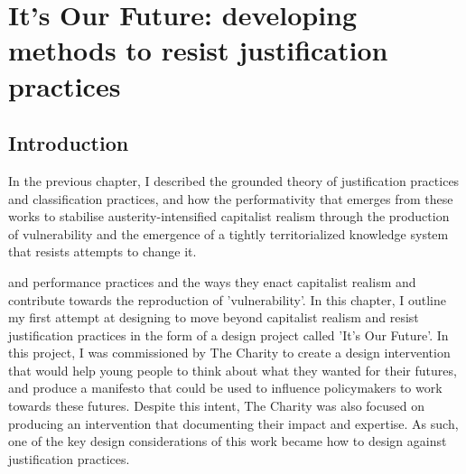 \chapter{It's Our Future: developing methods to resist justification practices}
\label{ch:7}

\section{Introduction}
\label{sec: 7-intro}

In the previous chapter, I described the grounded theory of justification practices and classification practices, and how the performativity that emerges from these works to stabilise austerity-intensified capitalist realism through the production of vulnerability and the emergence of a tightly territorialized knowledge system that resists attempts to change it. 

and performance practices and the ways they enact capitalist realism and contribute towards the reproduction of 'vulnerability'. In this chapter, I outline my first attempt at designing to move beyond capitalist realism and resist justification practices in the form of a design project called 'It's Our Future'. In this project, I was commissioned by The Charity to create a design intervention that would help young people to think about what they wanted for their futures, and produce a manifesto that could be used to influence policymakers to work towards these futures. Despite this intent, The Charity was also focused on producing an intervention that documenting their impact and expertise. As such, one of the key design considerations of this work became how to design against justification practices. 



